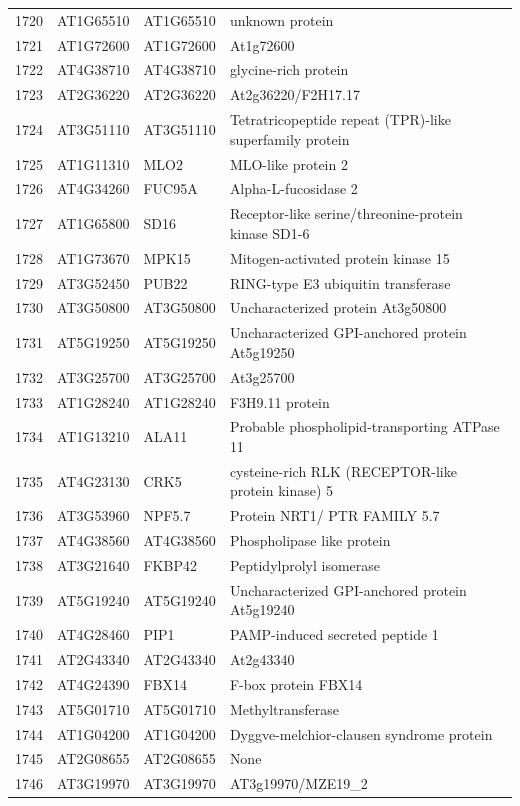 \documentclass[11pt]{article}
\begin{document}
\begin{center}
\begin{tabular}{rlll}
1720 & AT1G65510 & AT1G65510 & unknown protein\\
1721 & AT1G72600 & AT1G72600 & At1g72600\\
1722 & AT4G38710 & AT4G38710 & glycine-rich protein\\
1723 & AT2G36220 & AT2G36220 & At2g36220/F2H17.17\\
1724 & AT3G51110 & AT3G51110 & Tetratricopeptide repeat (TPR)-like superfamily protein\\
1725 & AT1G11310 & MLO2 & MLO-like protein 2\\
1726 & AT4G34260 & FUC95A & Alpha-L-fucosidase 2\\
1727 & AT1G65800 & SD16 & Receptor-like serine/threonine-protein kinase SD1-6\\
1728 & AT1G73670 & MPK15 & Mitogen-activated protein kinase 15\\
1729 & AT3G52450 & PUB22 & RING-type E3 ubiquitin transferase\\
1730 & AT3G50800 & AT3G50800 & Uncharacterized protein At3g50800\\
1731 & AT5G19250 & AT5G19250 & Uncharacterized GPI-anchored protein At5g19250\\
1732 & AT3G25700 & AT3G25700 & At3g25700\\
1733 & AT1G28240 & AT1G28240 & F3H9.11 protein\\
1734 & AT1G13210 & ALA11 & Probable phospholipid-transporting ATPase 11\\
1735 & AT4G23130 & CRK5 & cysteine-rich RLK (RECEPTOR-like protein kinase) 5\\
1736 & AT3G53960 & NPF5.7 & Protein NRT1/ PTR FAMILY 5.7\\
1737 & AT4G38560 & AT4G38560 & Phospholipase like protein\\
1738 & AT3G21640 & FKBP42 & Peptidylprolyl isomerase\\
1739 & AT5G19240 & AT5G19240 & Uncharacterized GPI-anchored protein At5g19240\\
1740 & AT4G28460 & PIP1 & PAMP-induced secreted peptide 1\\
1741 & AT2G43340 & AT2G43340 & At2g43340\\
1742 & AT4G24390 & FBX14 & F-box protein FBX14\\
1743 & AT5G01710 & AT5G01710 & Methyltransferase\\
1744 & AT1G04200 & AT1G04200 & Dyggve-melchior-clausen syndrome protein\\
1745 & AT2G08655 & AT2G08655 & None\\
1746 & AT3G19970 & AT3G19970 & AT3g19970/MZE19\_2\\

\end{tabular}
\end{center}
\end{document}
